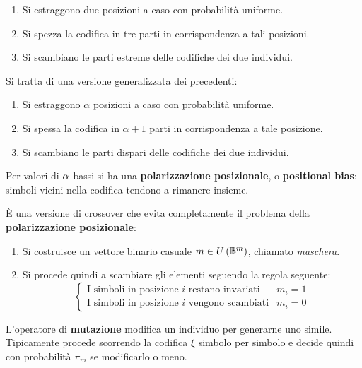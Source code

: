 \documentclass[\main/main.tex]{subfiles}
\begin{document}
\begin{multicols}{2}
\begin{definition}
\begin{enumerate}
            \item Si estraggono due posizioni a caso con probabilità uniforme.
            \item Si spezza la codifica in tre parti in corrispondenza a tali posizioni.
            \item Si scambiano le parti estreme delle codifiche dei due individui.
        \end{enumerate}
    \end{definition}
    \begin{definition}
        Si tratta di una versione generalizzata dei precedenti:
        \begin{enumerate}
            \item Si estraggono \(\alpha\) posizioni a caso con probabilità uniforme.
            \item Si spessa la codifica in \(\alpha+1\) parti in corrispondenza a tale posizione.
            \item Si scambiano le parti dispari delle codifiche dei due individui.
        \end{enumerate}
        Per valori di \(\alpha\) bassi si ha una \textbf{polarizzazione posizionale}, o \textbf{positional bias}: simboli vicini nella codifica tendono a rimanere insieme.
    \end{definition}
    \begin{definition}
        È una versione di crossover che evita completamente il problema della \textbf{polarizzazione posizionale}:
        \begin{enumerate}
            \item Si costruisce un vettore binario casuale \(m \in U\left(\mathbb{B}^m\right)\), chiamato \textit{maschera}.
            \item Si procede quindi a scambiare gli elementi seguendo la regola seguente:
            \[
                \begin{cases}
                    \text{I simboli in posizione \(i\) restano invariati} &m_i=1\\
                    \text{I simboli in posizione \(i\) vengono scambiati} &m_i=0
                \end{cases}
            \]
        \end{enumerate}
    \end{definition}
\begin{definition}[Mutazione]
    L'operatore di \textbf{mutazione} modifica un individuo per generarne uno simile. Tipicamente procede scorrendo la codifica \(\xi\) simbolo per simbolo e decide quindi con probabilità \(\pi_m\) se modificarlo o meno.

\end{definition}
\end{multicols}
\end{document}
